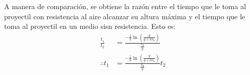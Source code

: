 \vspace{5 mm}
A manera de comparación, se obtiene la razón entre el tiempo que le toma al proyectil con resistencia al aire alcanzar
su altura máxima y el tiempo que le toma al proyectil en un medio sisn resistencia. Esto es:
\begin{align*}
    \frac{t_{1}}{t_{2}} &= \frac{-\frac{1}{k} \ln \left(\frac{g}{g+kv_{0}}\right)}{\frac{v_{0}}{g}} \\
    \therefore t_{1} &= \frac{-\frac{1}{k} \ln \left(\frac{g}{g+kv_{0}}\right)}{\frac{v_{0}}{g}} t_{2}
\end{align*}